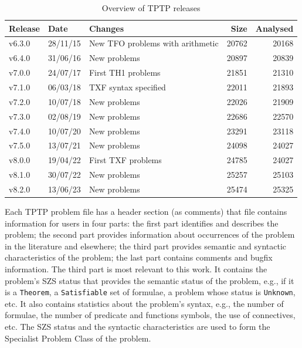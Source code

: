 \documentclass[runningheads]{llncs}
\begin{document}
\begin{table}[b!]
\begin{center}
\setlength{\tabcolsep}{4pt}
\begin{tabular}{ll|l|rr}
Release & Date     & Changes                                 & Size & Analysed \\
\hline
v6.3.0  & 28/11/15 & New TFO problems with arithmetic        &   20762 & 20168 \\
v6.4.0  & 31/06/16 & New problems                            &   20897 & 20839 \\
v7.0.0  & 24/07/17 & First TH1 problems                      &   21851 & 21310 \\
v7.1.0  & 06/03/18 & TXF syntax specified                    &   22011 & 21893 \\
v7.2.0  & 10/07/18 & New problems                            &   22026 & 21909 \\
v7.3.0  & 02/08/19 & New problems                            &   22686 & 22570 \\
v7.4.0  & 10/07/20 & New problems                            &   23291 & 23118 \\
v7.5.0  & 13/07/21 & New problems                            &   24098 & 24027 \\
v8.0.0  & 19/04/22 & First TXF problems                      &   24785 & 24027 \\
v8.1.0  & 30/07/22 & New problems                            &   25257 & 25103 \\
v8.2.0  & 13/06/23 & New problems                            &   25474 & 25325 \\
\end{tabular}
\end{center}
\caption{Overview of TPTP releases}
\label{TPTPReleases}
\end{table}

Each TPTP problem file has a header section (as comments) that file contains information for users
in four parts:
the first part identifies and describes the problem;
the second part provides information about occurrences of the problem in the literature and 
elsewhere;
the third part provides semantic and syntactic characteristics of the problem;
the last part contains comments and bugfix information.
The third part is most relevant to this work. 
It contains the problem's SZS status \cite{SZS03} that provides the semantic status of the 
problem, e.g., if it is a {\tt Theorem}, a {\tt Satisfiable} set of formulae, a problem whose 
status is {\tt Unknown}, etc.
It also contains statistics about the problem's syntax, e.g., the number of formulae, the 
number of predicate and functions symbols, the use of connectives, etc.
The SZS status and the syntactic characteristics are used to form the Specialist Problem Class
of the problem.
\end{document}
